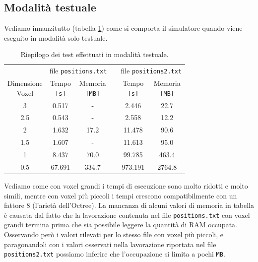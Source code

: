 \subsection{Modalità testuale}
Vediamo innanzitutto%
(tabella \ref{tab:graphicsnone}) come si comporta il simulatore quando viene eseguito in modalità solo testuale.
\begin{center}
  \begin{table}[h]
       \centering
      \begin{tabular}{cccccc}
        \toprule
        & \multicolumn{2}{c}{file \texttt{positions.txt}} & & \multicolumn{2}{c}{file \texttt{positions2.txt}}\\
        \cmidrule(r){2-3}\cmidrule(r){5-6}
          \shortstack{Dimensione\\ Voxel} & \shortstack{Tempo \\\texttt{[s]}} & \shortstack{Memoria \\\texttt{[MB]}} & & \shortstack{Tempo \\\texttt{[s]}} & \shortstack{Memoria \\\texttt{[MB]}}\\
        \midrule
          3   & 0.517  & -     & & 2.446   & 22.7   \\
          2.5 & 0.543  & -     & & 2.558   & 12.2   \\
          2   & 1.632  & 17.2  & & 11.478  & 90.6   \\
          1.5 & 1.607  & -     & & 11.613  & 95.0   \\
          1   & 8.437  & 70.0  & & 99.785  & 463.4  \\
          0.5 & 67.691 & 334.7 & & 973.191 & 2764.8 \\
        \bottomrule
      \end{tabular}
      \caption{Riepilogo dei test effettuati in modalità testuale.}
      \label{tab:graphicsnone}
  \end{table}
\end{center}
Vediamo come con voxel grandi i tempi di esecuzione sono molto ridotti e molto simili, mentre con voxel più piccoli i tempi crescono compatibilmente con un fattore 8 (l'arietà dell'Octree). La mancanza di alcuni valori di memoria in tabella è causata dal fatto che la lavorazione contenuta nel file \texttt{positions.txt} con voxel grandi termina prima che sia possibile leggere la quantità di RAM occupata. Osservando però i valori rilevati per lo stesso file con voxel più piccoli, e paragonandoli con i valori osservati nella lavorazione riportata nel file \texttt{positions2.txt} possiamo inferire che l'occupazione si limita a pochi \texttt{MB}.

